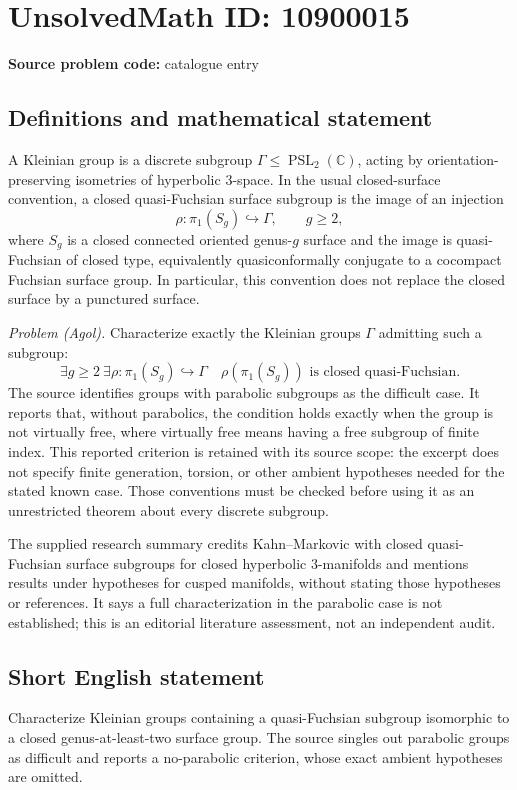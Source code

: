 \documentclass[11pt]{article}
\newcommand{\C}{\mathbb{C}}
\begin{document}
\section*{UnsolvedMath ID: 10900015}
\textbf{Source problem code:} catalogue entry
\subsection{Definitions and mathematical statement}
A Kleinian group is a discrete subgroup \(\Gamma\leq\operatorname{PSL}_2(\C)\), acting by orientation-preserving isometries of hyperbolic \(3\)-space. In the usual closed-surface convention, a closed quasi-Fuchsian surface subgroup is the image of an injection
\[
 \rho:\pi_1(S_g)\hookrightarrow\Gamma,\qquad g\geq2,
\]
where \(S_g\) is a closed connected oriented genus-\(g\) surface and the image is quasi-Fuchsian of closed type, equivalently quasiconformally conjugate to a cocompact Fuchsian surface group. In particular, this convention does not replace the closed surface by a punctured surface.

\emph{Problem (Agol).} Characterize exactly the Kleinian groups \(\Gamma\) admitting such a subgroup:
\[
 \exists g\geq2\ \exists\rho:\pi_1(S_g)\hookrightarrow\Gamma
 \quad\rho(\pi_1(S_g))\text{ is closed quasi-Fuchsian}.
\]
The source identifies groups with parabolic subgroups as the difficult case. It reports that, without parabolics, the condition holds exactly when the group is not virtually free, where virtually free means having a free subgroup of finite index. This reported criterion is retained with its source scope: the excerpt does not specify finite generation, torsion, or other ambient hypotheses needed for the stated known case. Those conventions must be checked before using it as an unrestricted theorem about every discrete subgroup.

The supplied research summary credits Kahn--Markovic with closed quasi-Fuchsian surface subgroups for closed hyperbolic \(3\)-manifolds and mentions results under hypotheses for cusped manifolds, without stating those hypotheses or references. It says a full characterization in the parabolic case is not established; this is an editorial literature assessment, not an independent audit.
\subsection{Short English statement}
Characterize Kleinian groups containing a quasi-Fuchsian subgroup isomorphic to a closed genus-at-least-two surface group. The source singles out parabolic groups as difficult and reports a no-parabolic criterion, whose exact ambient hypotheses are omitted.
\end{document}
